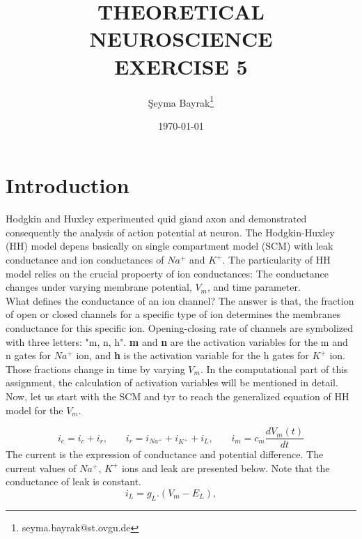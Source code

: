 \documentclass{article}
\begin{document}
\title{THEORETICAL NEUROSCIENCE \\ EXERCISE 5}
\date{\today}
\author[1]{\c{S}eyma Bayrak\thanks{seyma.bayrak@st.ovgu.de}}
\maketitle

\section{Introduction}
Hodgkin and Huxley experimented quid giand axon and demonstrated consequently the analysis of action potential at neuron. The Hodgkin-Huxley (HH) model depens basically on single compartment model (SCM) with leak conductance and ion conductances of $Na^+$ and  $K^+$. The particularity of HH model relies on the crucial propoerty of ion conductances: The conductance changes under varying membrane potential, $V_{m}$, and time parameter.  \\

What defines the conductance of an ion channel? The answer is that, the fraction of open or closed channels for a specific type of ion determines the membranes conductance for this specific ion. Opening-closing rate of channels are symbolized with three letters: "m, n, h". \textbf{m} and \textbf{n} are the activation variables for the m and n gates for $Na^+$ ion, and \textbf{h} is the activation variable for the h gates for $K^+$ ion. Those fractions change in time by varying $V_{m}$. In the computational part of this assignment, the calculation of activation variables will be mentioned in detail.\\

Now, let us start with the SCM and tyr to reach the generalized equation of HH model for the $V_{m}$.

\begin{equation}
i_{e}=i_{c}+i_{r}, \,\,\,\,\,\,\,\,\,\,\, i_{r}=i_{Na^+}+i_{K^+}+i_{L}, \,\,\,\,\,\,\,\,\,\,\,i_{m}=c_{m}\frac{dV_{m}(t)}{dt}  
\end{equation}
The current is the expression of conductance and potential difference. The current values of $Na^+$, $K^+$ ions and leak are presented below. Note that the conductance of leak is constant.
\begin{equation*}
i_{L}=g_{L}.(V_{m}-E_{L}),\,\,\,\,\,\,\,\,\,\,\,\,
\end{equation*}
\end{document}
